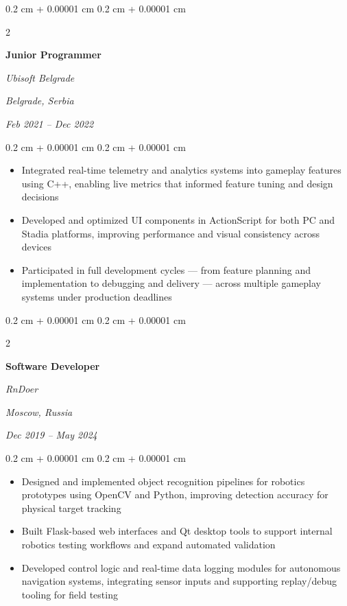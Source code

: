 \documentclass[10pt, letterpaper]{article}
\newenvironment{highlights}{
    \begin{itemize}[
        topsep=0.10 cm,
        parsep=0.10 cm,
        partopsep=0pt,
        itemsep=0pt,
        leftmargin=0.4 cm + 10pt
    ]
}{
    \end{itemize}
} %
\newenvironment{onecolentry}{
    \begin{adjustwidth}{
        0.2 cm + 0.00001 cm
    }{
        0.2 cm + 0.00001 cm
    }
}{
    \end{adjustwidth}
} %
\newenvironment{twocolentry}[2][]{
    \onecolentry
    \def\secondColumn{#2}
    \setcolumnwidth{\fill, 4.5 cm}
    \begin{paracol}{2}
}{
    \switchcolumn \raggedleft \secondColumn
    \end{paracol}
    \endonecolentry
} %
\begin{document}
        \vspace{0.2 cm}

        \begin{twocolentry}{
        \textit{Belgrade, Serbia}    
            
        \textit{Feb 2021 –  Dec 2022}}
            \textbf{Junior Programmer}
            
            \textit{Ubisoft Belgrade}
        \end{twocolentry}

        \vspace{0.10 cm}
        \begin{onecolentry}
            \begin{highlights}
                \item Integrated real-time telemetry and analytics systems into gameplay features using C++, enabling live metrics that informed feature tuning and design decisions
                \item Developed and optimized UI components in ActionScript for both PC and Stadia platforms, improving performance and visual consistency across devices
                \item Participated in full development cycles — from feature planning and implementation to debugging and delivery — across multiple gameplay systems under production deadlines
            \end{highlights}
        \end{onecolentry}
        
        \vspace{0.2 cm}

        \begin{twocolentry}{
        \textit{Moscow, Russia}    
            
        \textit{Dec 2019 –  May 2024}}
            \textbf{Software Developer}
            
            \textit{RnDoer}
        \end{twocolentry}

        \vspace{0.10 cm}
        \begin{onecolentry}
            \begin{highlights}
                \item Designed and implemented object recognition pipelines for robotics prototypes using OpenCV and Python, improving detection accuracy for physical target tracking
                \item Built Flask-based web interfaces and Qt desktop tools to support internal robotics testing workflows and expand automated validation
                \item Developed control logic and real-time data logging modules for autonomous navigation systems, integrating sensor inputs and supporting replay/debug tooling for field testing
            \end{highlights}
        \end{onecolentry}    
        
\end{document}
